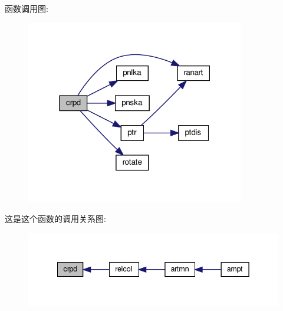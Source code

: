 函数调用图\+:
\nopagebreak
\begin{figure}[H]
\begin{center}
\leavevmode
\includegraphics[width=271pt]{crpd_8f90_af91d6b16716eca83867b47e1dac207ef_cgraph}
\end{center}
\end{figure}
这是这个函数的调用关系图\+:
\nopagebreak
\begin{figure}[H]
\begin{center}
\leavevmode
\includegraphics[width=342pt]{crpd_8f90_af91d6b16716eca83867b47e1dac207ef_icgraph}
\end{center}
\end{figure}
